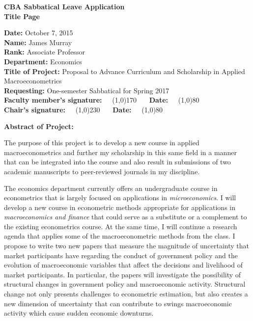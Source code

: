 \documentclass[11pt]{article}
\begin{document}
\thispagestyle{empty}

\begin{center}
\textbf{CBA Sabbatical Leave Application}\\
\textbf{Title Page}\\
\end{center}

\noindent \textbf{Date:} October 7, 2015\\
\noindent \textbf{Name:} James Murray \\
\noindent \textbf{Rank:} Associate Professor\\ 
\noindent \textbf{Department:} Economics\\
\noindent \textbf{Title of Project:} Proposal to Advance Curriculum and Scholarship in Applied Macroeconometrics  \\
\noindent \textbf{Requesting:} One-semester Sabbatical for Spring 2017 \\

\noindent \textbf{Faculty member's signature:~~} \line(1,0){170}~~~ \textbf{Date:~~} \line(1,0){80} \\

\noindent \textbf{Chair's signature:~~} \line(1,0){230}~~~ \textbf{Date:~~} \line(1,0){80} \\

\begin{center}\textbf{Abstract of Project:}\end{center}

The purpose of this project is to develop a new course in applied macroeconometrics and further my scholarship in this same field in a manner that can be integrated into the course and also result in submissions of two academic manuscripts to peer-reviewed journals in my discipline.  

The economics department currently offers an undergraduate course in econometrics that is largely focused on applications in \textit{microeconomics}.  I will develop a new course in econometric methods appropriate for applications in \textit{macroeconomics and finance} that could serve as a substitute or a complement to the existing econometrics course.  At the same time, I will continue a research agenda that applies some of the macroeconometric methods from the class.  I propose to write two new papers that measure the magnitude of uncertainty that market participants have regarding the conduct of government policy and the evolution of macroeconomic variables that affect the decisions and livelihood of market participants.  In particular, the papers will investigate the possibility of structural changes in government policy and macroeconomic activity.  Structural change not only presents challenges to econometric estimation, but also creates a new dimension of uncertainty that can contribute to swings macroeconomic activity which cause sudden economic downturns. 
\end{document}

